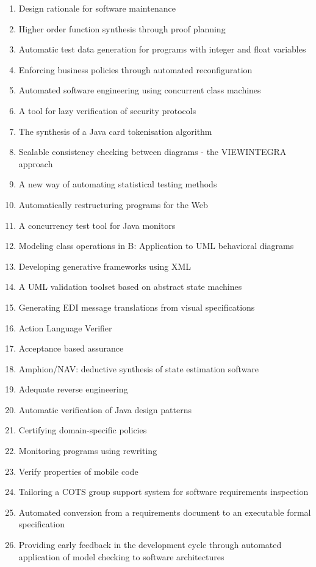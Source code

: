 \begin{enumerate}[itemsep=-1ex]
  \item Design rationale for software maintenance
  \item Higher order function synthesis through proof planning
  \item Automatic test data generation for programs with integer and float variables
  \item Enforcing business policies through automated reconfiguration
  \item Automated software engineering using concurrent class machines
  \item A tool for lazy verification of security protocols
  \item The synthesis of a Java card tokenisation algorithm
  \item Scalable consistency checking between diagrams - the VIEWINTEGRA approach
  \item A new way of automating statistical testing methods
  \item Automatically restructuring programs for the Web
  \item A concurrency test tool for Java monitors
  \item Modeling class operations in B: Application to UML behavioral diagrams
  \item Developing generative frameworks using XML
  \item A UML validation toolset based on abstract state machines
  \item Generating EDI message translations from visual specifications
  \item Action Language Verifier
  \item Acceptance based assurance
  \item Amphion/NAV: deductive synthesis of state estimation software
  \item Adequate reverse engineering
  \item Automatic verification of Java design patterns
  \item Certifying domain-specific policies
  \item Monitoring programs using rewriting
  \item Verify properties of mobile code
  \item Tailoring a COTS group support system for software requirements inspection
  \item Automated conversion from a requirements document to an executable formal specification
  \item Providing early feedback in the development cycle through automated application of model checking to software architectures

\end{enumerate}
